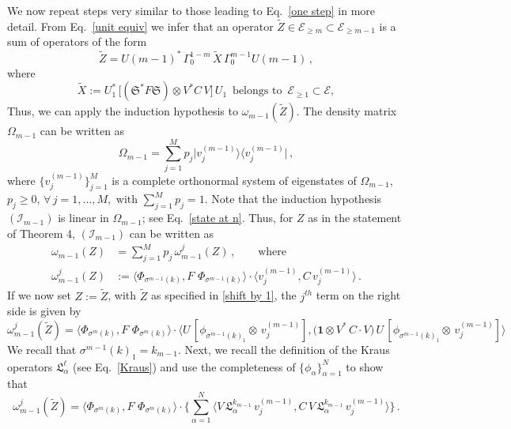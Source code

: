 \documentclass[12pt]{article}
\begin{document}
We now repeat steps very similar to those leading to Eq.~\eqref{one step} in more detail.
From Eq.~\eqref{unit equiv} we infer that an operator 
$\tilde{Z} \in \mathcal{E}_{\geq m}\subset \mathcal{E}_{\geq m-1}$ is a sum of operators of the form
\begin{equation}\label{shift by 1}
\tilde{Z} = U(m-1)^{*} \,\Gamma_{0}^{1-m}\, \tilde{X}\,\Gamma_{0}^{m-1} U(m-1)\,,
\end{equation}
where 
$$\tilde{X}:= U_{1}^{*}\, \big[(\mathfrak{S}^{*}F\mathfrak{S})\otimes V^{*}C\,V\big]\,U_1 \,\text{ belongs to }\, \mathcal{E}_{\geq 1}\subset \mathcal{E},$$
Thus, we can apply the induction hypothesis to $\omega_{m-1}(\tilde{Z})$. 
The density matrix $\Omega_{m-1}$ can be written as
\begin{equation}\label{matrix}
\Omega_{m-1}= \sum_{j=1}^{M} p_j \vert v_j^{(m-1)}\rangle \langle v_j^{(m-1)} \vert\,,
\end{equation}
where $\big\{ v_{j}^{(m-1)} \big\}_{j=1}^{M}$ is a complete orthonormal system of eigenstates of $\Omega_{m-1}$, $p_j \geq 0,\,\forall \,j=1,\dots, M,$ with \mbox{$\sum_{j=1}^{M}p_j =1$.}
Note that the induction hypothesis $(\mathcal{I}_{m-1})$ is linear in $\Omega_{m-1}$; see Eq.~\eqref{state at n}. Thus, for $Z$ as in the statement of Theorem 4, $(\mathcal{I}_{m-1})$ can be written as
\begin{align}\label{expand}
\omega_{m-1}(Z)&=\sum_{j=1}^{M} p_j \,\omega_{m-1}^{j}(Z)\,, \qquad \text{where} \nonumber \\
 \omega_{m-1}^{j}(Z)&:= \langle \Phi_{\sigma^{m-1}({k})}, F\,\, \Phi_{\sigma^{m-1}({k})} \rangle \cdot \langle v_{j}^{(m-1)}, C\,v_{j}^{(m-1)}\rangle\,. 
\end{align}
If we now set $Z:=\tilde{Z}$, with $\tilde{Z}$ as specified in \eqref{shift by 1}, the $j^{th}$ term on the right side is given by
\begin{equation}\label{jth term}
\omega_{m-1}^{j}(\tilde{Z})=\langle \Phi_{\sigma^{m}({k})}, F\,\, \Phi_{\sigma^{m}({k})} \rangle \cdot
\langle U\,[ \phi_{\sigma^{m-1}({k})_{1}}\otimes \,v_{j}^{(m-1)} ], \big(\mathbf{1}\otimes 
V^{*}\,C\cdot V \big)\,U\,[\phi_{\sigma^{m-1}({k})_{1}}\otimes \,v_{j}^{(m-1)} ]\rangle
\end{equation}
We recall that $\sigma^{m-1}({k})_1 = k_{m-1}$. Next, we recall the definition of the Kraus operators 
$\mathfrak{L}_{\alpha}^{\ell}$ (see Eq.~\eqref{Kraus}) and use the completeness of 
$\big\{\phi_{\alpha}\big\}_{\alpha=1}^{N}$ to show that
$$\omega_{m-1}^{j}(\tilde{Z})= \langle \Phi_{\sigma^{m}({k})}, F\,\, 
\Phi_{\sigma^{m}({k})} \rangle \cdot \Big\{ \sum_{\alpha=1}^{N} \langle V\,\mathfrak{L}_{\alpha}^{{k}_{m-1}}\,
v_{j}^{(m-1)}, C\,V\,\mathfrak{L}_{\alpha}^{{k}_{m-1}}\, v_{j}^{(m-1)}\rangle\Big\}\,.$$
\end{document}
